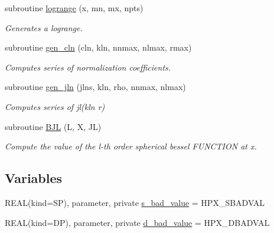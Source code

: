 \begin{DoxyCompactItemize}
subroutine \hyperlink{namespacef3dex__transforms_a2cd270ebc1186ae3872ab2e0068cff9d}{logrange} (x, mn, mx, npts)
\begin{DoxyCompactList}\small\item\em Generates a logrange. \end{DoxyCompactList}\item 
subroutine \hyperlink{namespacef3dex__transforms_aa6cd797c56b97503bf2d52131f6e5554}{gen\_\-cln} (cln, kln, nnmax, nlmax, rmax)
\begin{DoxyCompactList}\small\item\em Computes series of normalization coefficients. \end{DoxyCompactList}\item 
subroutine \hyperlink{namespacef3dex__transforms_ad1ab102a8307876c7af8bd6868ea7ef2}{gen\_\-jln} (jlns, kln, rho, nnmax, nlmax)
\begin{DoxyCompactList}\small\item\em Computes series of jl(kln r) \end{DoxyCompactList}\item 
subroutine \hyperlink{namespacef3dex__transforms_a9b68481c890d75c3e3f4cbd4a7109830}{BJL} (L, X, JL)
\begin{DoxyCompactList}\small\item\em Compute the value of the l-\/th order spherical bessel FUNCTION at x. \end{DoxyCompactList}\end{DoxyCompactItemize}
\subsection*{Variables}
\begin{DoxyCompactItemize}
\item 
REAL(kind=SP), parameter, private \hyperlink{namespacef3dex__transforms_a2fbf86c61b3f102ffaa43870e3523f02}{s\_\-bad\_\-value} = HPX\_\-SBADVAL
\item 
REAL(kind=DP), parameter, private \hyperlink{namespacef3dex__transforms_a179e0089cbbd29b50ea12d1a8298b99a}{d\_\-bad\_\-value} = HPX\_\-DBADVAL
\end{DoxyCompactItemize}


